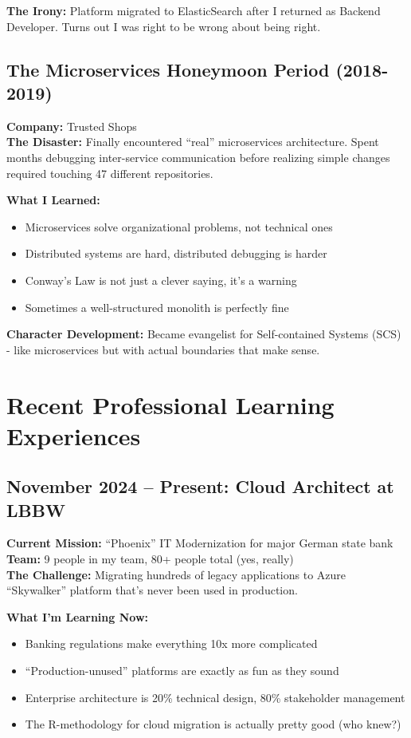 \documentclass[11pt,a4paper]{article}
\begin{document}
\textbf{The Irony:} Platform migrated to ElasticSearch after I returned as Backend Developer. Turns out I was right to be wrong about being right.

\subsection{The Microservices Honeymoon Period (2018-2019)}
\textbf{Company:} Trusted Shops\\
\textbf{The Disaster:} Finally encountered ``real'' microservices architecture. Spent months debugging inter-service communication before realizing simple changes required touching 47 different repositories.

\textbf{What I Learned:} 
\begin{itemize}[leftmargin=1.5em, itemsep=0.1em]
\item Microservices solve organizational problems, not technical ones
\item Distributed systems are hard, distributed debugging is harder
\item Conway's Law is not just a clever saying, it's a warning
\item Sometimes a well-structured monolith is perfectly fine
\end{itemize}

\textbf{Character Development:} Became evangelist for Self-contained Systems (SCS) - like microservices but with actual boundaries that make sense.

\newpage

\section{Recent Professional Learning Experiences}

\subsection{November 2024 -- Present: Cloud Architect at LBBW}
\textbf{Current Mission:} ``Phoenix'' IT Modernization for major German state bank\\
\textbf{Team:} 9 people in my team, 80+ people total (yes, really)\\
\textbf{The Challenge:} Migrating hundreds of legacy applications to Azure ``Skywalker'' platform that's never been used in production.

\textbf{What I'm Learning Now:}
\begin{itemize}[leftmargin=1.5em, itemsep=0.1em]
\item Banking regulations make everything 10x more complicated
\item ``Production-unused'' platforms are exactly as fun as they sound
\item Enterprise architecture is 20\% technical design, 80\% stakeholder management
\item The R-methodology for cloud migration is actually pretty good (who knew?)
\end{itemize}
\end{document}
